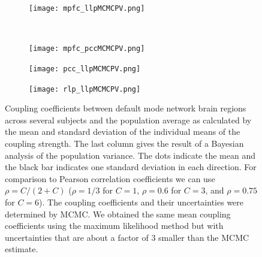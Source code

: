 \documentclass[%
 reprint,
 amsmath,amssymb,
 aps,
]{revtex4-1}
\begin{document}
\begin{figure}[H]
    \centering
    \begin{subfigure}[b]{0.3\textwidth}
        \texttt{[image: mpfc\_llpMCMCPV.png]}
        \label{fig:mpfc_llp}
    \end{subfigure}
    ~ %
    \begin{subfigure}[b]{0.3\textwidth}
        \texttt{[image: mpfc\_pccMCMCPV.png]}
        \label{fig:mpfc_pcc}
    \end{subfigure}
    \begin{subfigure}[b]{0.3\textwidth}
        \texttt{[image: pcc\_llpMCMCPV.png]}
        \label{fig:llp_pcc}
    \end{subfigure}
    \begin{subfigure}[b]{0.3\textwidth}
        \texttt{[image: rlp\_llpMCMCPV.png]}
        \label{fig:rlp_llp}
    \end{subfigure}
	\caption{Coupling coefficients between default mode network brain regions across several subjects and the population average as calculated by the mean and standard deviation of the individual means of the coupling strength.  The last column gives the result of a Bayesian analysis of the population variance.  The dots indicate the mean and the black bar indicates one standard deviation in each direction.  For comparison to Pearson correlation coefficients we can use $\rho = C/(2+C)$ ($\rho=1/3$ for $C=1$, $\rho=0.6$ for $C=3$,  and $\rho=0.75$ for $C=6$).  The coupling coefficients and their uncertainties were determined by MCMC.  We obtained the same mean coupling coefficients using the maximum likelihood method but with uncertainties that are about a factor of 3 smaller than the MCMC estimate.}\label{fig:coupling_coef}
\end{figure}
\end{document}

